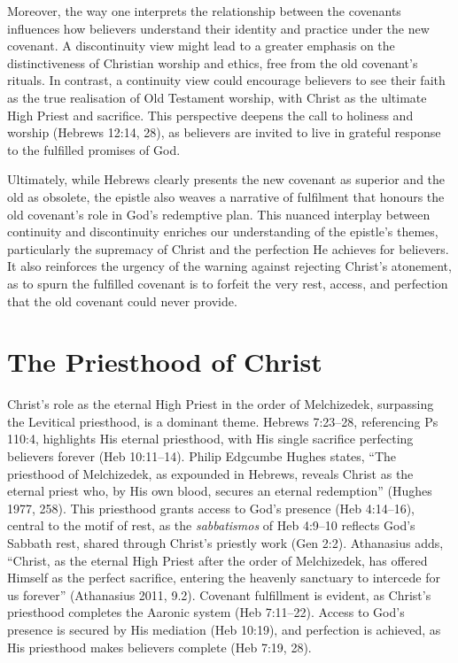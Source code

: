 \documentclass[12pt]{article}
\begin{document}
Moreover, the way one interprets the relationship between the covenants
influences how believers understand their identity and practice under the new
covenant. A discontinuity view might lead to a greater emphasis on the
distinctiveness of Christian worship and ethics, free from the old covenant’s
rituals. In contrast, a continuity view could encourage believers to see their
faith as the true realisation of Old Testament worship, with Christ as the
ultimate High Priest and sacrifice. This perspective deepens the call to
holiness and worship (Hebrews 12:14, 28), as believers are invited to live in
grateful response to the fulfilled promises of God.

Ultimately, while Hebrews clearly presents the new covenant as superior and the
old as obsolete, the epistle also weaves a narrative of fulfilment that honours
the old covenant’s role in God’s redemptive plan. This nuanced interplay between
continuity and discontinuity enriches our understanding of the epistle’s themes,
particularly the supremacy of Christ and the perfection He achieves for
believers. It also reinforces the urgency of the warning against rejecting
Christ’s atonement, as to spurn the fulfilled covenant is to forfeit the very
rest, access, and perfection that the old covenant could never provide.

\section{The Priesthood of Christ}
Christ’s role as the eternal High Priest in the order of Melchizedek,
surpassing the Levitical priesthood, is a dominant theme. Hebrews 7:23--28,
referencing Ps 110:4, highlights His eternal priesthood, with His single
sacrifice perfecting believers forever (Heb 10:11--14). Philip Edgcumbe Hughes
states, ``The priesthood of Melchizedek, as expounded in Hebrews, reveals
Christ as the eternal priest who, by His own blood, secures an eternal
redemption'' (Hughes 1977, 258). This priesthood grants access to God’s
presence (Heb 4:14--16), central to the motif of rest, as the
\textit{sabbatismos} of Heb 4:9--10 reflects God’s Sabbath rest, shared through
Christ’s priestly work (Gen 2:2). Athanasius adds, ``Christ, as the eternal
High Priest after the order of Melchizedek, has offered Himself as the perfect
sacrifice, entering the heavenly sanctuary to intercede for us forever''
(Athanasius 2011, 9.2). Covenant fulfillment is evident, as Christ’s priesthood
completes the Aaronic system (Heb 7:11--22). Access to God’s presence is
secured by His mediation (Heb 10:19), and perfection is achieved, as His
priesthood makes believers complete (Heb 7:19, 28).
\end{document}
